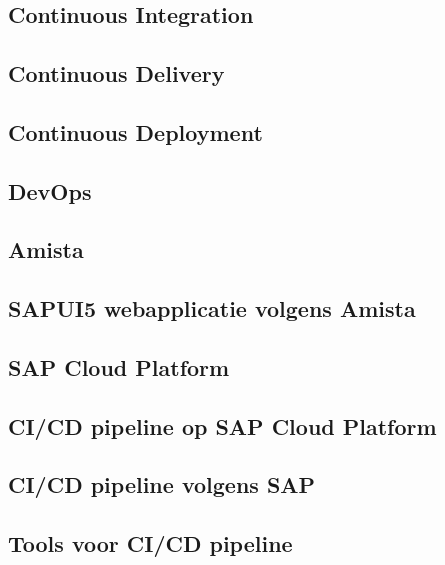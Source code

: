 \chapter{}
\label{ch:stand-van-zaken}


\section{Continuous Integration}
\label{sec:continuous-integration}

\section{Continuous Delivery}
\label{sec:continuous-delivery}

\section{Continuous Deployment}
\label{sec:continuous-deployment}

\section{DevOps}
\label{sec:devops}

\section{Amista}
\label{sec:amista}

\section{SAPUI5 webapplicatie volgens Amista}
\label{sec:sapui5-sap-hana}

\section{SAP Cloud Platform}
\label{sec:sap-cloud-platform}

\section{CI/CD pipeline op SAP Cloud Platform}
\label{sec:ci-cd-op-sap-cloud-platform}

\section{CI/CD pipeline volgens SAP}
\label{sec:ci-cd-pipeling-volgens-sap}

\section{Tools voor CI/CD pipeline}
\label{sec:tools-voor-pipeline}

